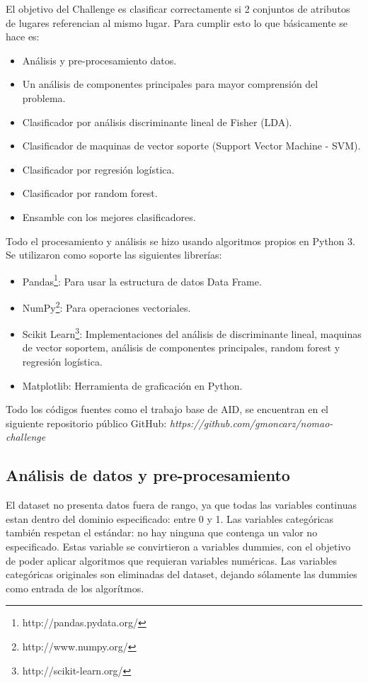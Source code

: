 \documentclass[journal]{IEEEtran}
\begin{document}
El objetivo del Challenge es clasificar correctamente si 2 conjuntos 
de atributos de lugares referencian al mismo lugar. Para cumplir esto lo que básicamente se hace es:
\begin{itemize}
\item Análisis y pre-procesamiento datos. 
\item Un análisis de componentes principales para mayor comprensión del problema. 
\item Clasificador por análisis discriminante lineal de Fisher (LDA).
\item Clasificador de maquinas de vector soporte (Support Vector Machine - SVM).
\item Clasificador por regresión logística.
\item Clasificador por random forest.
\item Ensamble con los mejores clasificadores.
\end{itemize}

Todo el procesamiento y análisis se hizo usando algoritmos propios en Python 3. Se
utilizaron como soporte las siguientes librerías:
\begin{itemize}
\item Pandas\footnote{http://pandas.pydata.org/}: Para usar la estructura de datos Data Frame.
\item NumPy\footnote{http://www.numpy.org/}: Para operaciones vectoriales.
\item Scikit Learn\footnote{http://scikit-learn.org/}: Implementaciones del análisis 
	de discriminante lineal, maquinas de vector soportem, análisis
	de componentes principales, random forest y regresión logística.
\item Matplotlib: Herramienta de graficación en Python.
\end{itemize}

Todo los códigos fuentes como el trabajo base de AID,
se encuentran en el siguiente repositorio público GitHub: 
\textit{https://github.com/gmoncarz/nomao-challenge}

\subsection{Análisis de datos y pre-procesamiento}
El dataset no presenta datos fuera de rango, ya que todas las variables continuas estan
dentro del dominio especificado: entre 0 y 1. Las variables 
categóricas también respetan el estándar: no hay ninguna
que contenga un valor no especificado. Estas 
variable se convirtieron a variables dummies, con el objetivo 
de poder aplicar algoritmos que requieran variables numéricas. Las
variables categóricas originales son eliminadas del
dataset, dejando sólamente las dummies como entrada de los
algorítmos.
\end{document}

